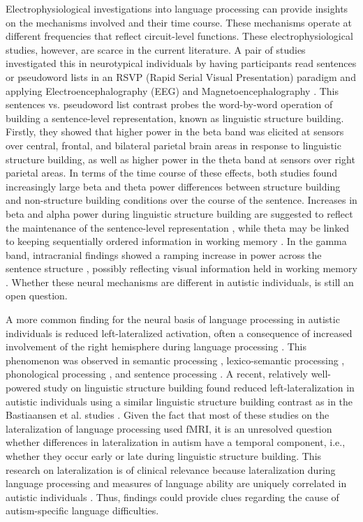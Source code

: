Electrophysiological investigations into language processing can provide insights on the mechanisms involved and their time course. These mechanisms operate at different frequencies that reflect circuit-level functions. These electrophysiological studies, however, are scarce in the current literature. A pair of studies investigated this in neurotypical individuals by having participants read sentences or pseudoword lists in an RSVP (Rapid Serial Visual Presentation) paradigm and applying Electroencephalography (EEG) and Magnetoencephalography \citep[MEG][]{bastiaansen2010,bastiaansen2015}. This sentences vs. pseudoword list contrast probes the word-by-word operation of building a sentence-level representation, known as linguistic structure building. Firstly, they showed that higher power in the beta band was elicited at sensors over central, frontal, and bilateral parietal brain areas in response to linguistic structure building, as well as higher power in the theta band at sensors over right parietal areas. In terms of the time course of these effects, both studies found increasingly large beta and theta power differences between structure building and non-structure building conditions over the course of the sentence. Increases in beta and alpha power during linguistic structure building are suggested to reflect the maintenance of the sentence-level representation \citep{engel2010,lewis2016}, while theta may be linked to keeping sequentially ordered information in working memory \citep{roux2014,vignali2016}. In the gamma band, intracranial findings showed a ramping increase in power across the sentence structure \citep{fedorenko2016}, possibly reflecting visual information held in working memory \citep{bastos2018,honkanon2015,roux2014,vignali2016}. Whether these neural mechanisms are different in autistic individuals, is still an open question.

A more common finding for the neural basis of language processing in autistic individuals is reduced left-lateralized activation, often a consequence of increased involvement of the right hemisphere during language processing \citep{herringshaw2016}. This phenomenon was observed in semantic processing \citep{knaus2008}, lexico-semantic processing \citep{coffeycorina2008}, phonological processing \citep{dawson1986}, and sentence processing \citep{muller1999}. A recent, relatively well-powered study on linguistic structure building found reduced left-lateralization in autistic individuals using a similar linguistic structure building contrast as in the Bastiaansen et al. studies \citep{jouravlev2020}. Given the fact that most of these studies on the lateralization of language processing used fMRI, it is an unresolved question whether differences in lateralization in autism have a temporal component, i.e., whether they occur early or late during linguistic structure building. This research on lateralization is of clinical relevance because lateralization during language processing and measures of language ability are uniquely correlated in autistic individuals \citep{lindell2013}. Thus, findings could provide clues regarding the cause of autism-specific language difficulties. 

